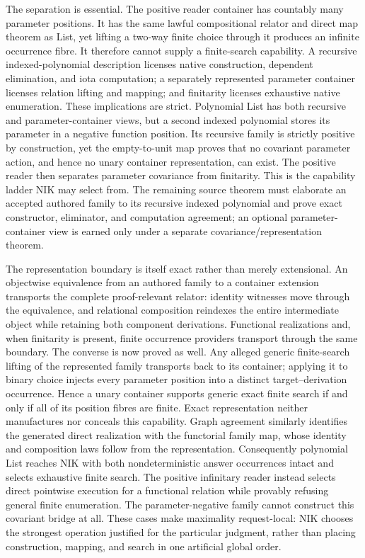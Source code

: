 \documentclass[11pt]{article}
\begin{document}
The separation is essential.  The positive reader container has countably many
parameter positions.  It has the same lawful compositional relator and direct
map theorem as List, yet lifting a two-way finite choice through it produces an
infinite occurrence fibre.  It therefore cannot supply a finite-search
capability.  A recursive indexed-polynomial description licenses native
construction, dependent elimination, and iota computation; a separately
represented parameter container licenses relation lifting and mapping; and
finitarity licenses exhaustive native enumeration.  These implications are
strict.  Polynomial List has both recursive and parameter-container views, but
a second indexed polynomial stores its parameter in a negative function
position.  Its recursive family is strictly positive by construction, yet the
empty-to-unit map proves that no covariant parameter action, and hence no unary
container representation, can exist.  The positive reader then separates
parameter covariance from finitarity.  This is the capability ladder NIK may
select from.  The remaining source theorem must elaborate an accepted authored
family to its recursive indexed polynomial and prove exact constructor,
eliminator, and computation agreement; an optional parameter-container view is
earned only under a separate covariance/representation theorem.

The representation boundary is itself exact rather than merely extensional.
An objectwise equivalence from an authored family to a container extension
transports the complete proof-relevant relator: identity witnesses move through
the equivalence, and relational composition reindexes the entire intermediate
object while retaining both component derivations.  Functional realizations
and, when finitarity is present, finite occurrence providers transport through
the same boundary.  The converse is now proved as well.  Any alleged generic
finite-search lifting of the represented family transports back to its
container; applying it to binary choice injects every parameter position into
a distinct target--derivation occurrence.  Hence a unary container supports
generic exact finite search if and only if all of its position fibres are
finite.  Exact representation neither manufactures nor conceals this
capability.  Graph agreement similarly identifies the generated direct
realization with the functorial family map, whose identity and composition laws
follow from the representation.  Consequently polynomial List reaches NIK with both
nondeterministic answer occurrences intact and selects exhaustive finite
search.  The positive infinitary reader instead selects direct pointwise
execution for a functional relation while provably refusing general finite
enumeration.  The parameter-negative family cannot construct this covariant
bridge at all.  These cases make maximality request-local: NIK chooses the
strongest operation justified for the particular judgment, rather than
placing construction, mapping, and search in one artificial global order.
\end{document}
